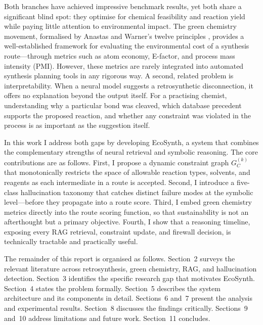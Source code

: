 \documentclass[12pt,a4paper]{article}
\begin{document}
Both branches have achieved impressive benchmark results, yet both share a
significant blind spot: they optimise for chemical feasibility and reaction
yield while paying little attention to environmental impact. The green chemistry
movement, formalised by Anastas and Warner's twelve principles \cite{anastas1998greenchemistry},
provides a well-established framework for evaluating the environmental cost of
a synthesis route—through metrics such as atom economy, E-factor, and process
mass intensity (PMI). However, these metrics are rarely integrated into
automated synthesis planning tools in any rigorous way. A second, related
problem is interpretability. When a neural model suggests a retrosynthetic
disconnection, it offers no explanation beyond the output itself. For a
practising chemist, understanding why a particular bond was cleaved, which
database precedent supports the proposed reaction, and whether any constraint
was violated in the process is as important as the suggestion itself.

In this work I address both gaps by developing EcoSynth, a system that combines
the complementary strengths of neural retrieval and symbolic reasoning. The
core contributions are as follows. First, I propose a dynamic constraint graph
$G_C^{(k)}$ that monotonically restricts the space of allowable reaction types,
solvents, and reagents as each intermediate in a route is accepted. Second, I
introduce a five-class hallucination taxonomy that catches distinct failure
modes at the symbolic level—before they propagate into a route score. Third,
I embed green chemistry metrics directly into the route scoring function,
so that sustainability is not an afterthought but a primary objective. Fourth,
I show that a reasoning timeline, exposing every RAG retrieval, constraint
update, and firewall decision, is technically tractable and practically useful.

The remainder of this report is organised as follows. Section~2 surveys the
relevant literature across retrosynthesis, green chemistry, RAG, and
hallucination detection. Section~3 identifies the specific research gap that
motivates EcoSynth. Section~4 states the problem formally. Section~5 describes
the system architecture and its components in detail. Sections~6 and~7 present
the analysis and experimental results. Section~8 discusses the findings
critically. Sections~9 and~10 address limitations and future work.
Section~11 concludes.

\end{document}
